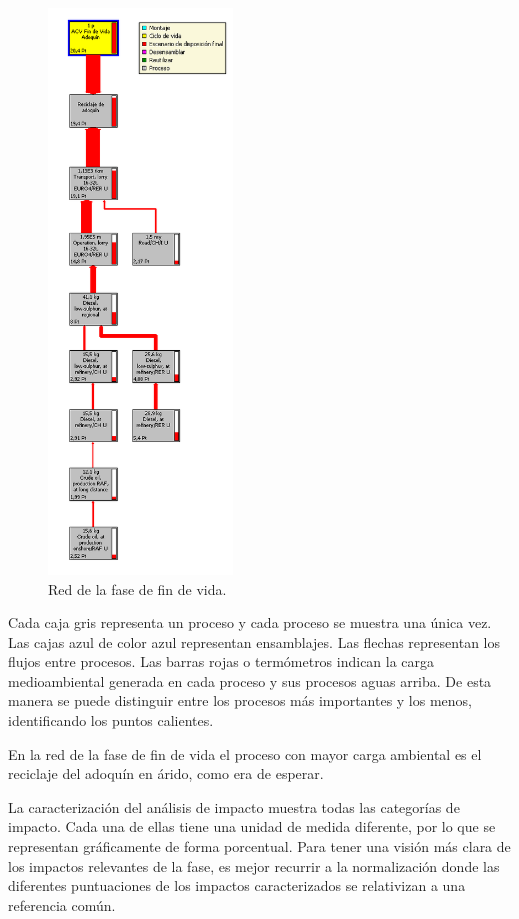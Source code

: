 \begin{figure}[!htb]
\centering
\includegraphics[height=15cm]{img/fdv_red.png}
\caption{Red de la fase de fin de vida.}
\label{fig:uso_red}
\end{figure}

Cada caja gris representa un proceso y cada proceso se muestra una única vez. Las cajas azul de color azul representan ensamblajes. Las flechas representan los flujos entre procesos. Las barras rojas o termómetros indican la carga medioambiental generada en cada proceso y sus procesos aguas arriba. De esta manera se puede distinguir entre los procesos más importantes y los menos, identificando los puntos calientes.

En la red de la fase de fin de vida el proceso con mayor carga ambiental es el reciclaje del adoquín en árido, como era de esperar.

La caracterización del análisis de impacto muestra todas las categorías de impacto. Cada una de ellas tiene una unidad de medida diferente, por lo que se representan gráficamente de forma porcentual. Para tener una visión más clara de los impactos relevantes de la fase, es mejor recurrir a la normalización donde las diferentes puntuaciones de los impactos caracterizados se relativizan a una referencia común.

